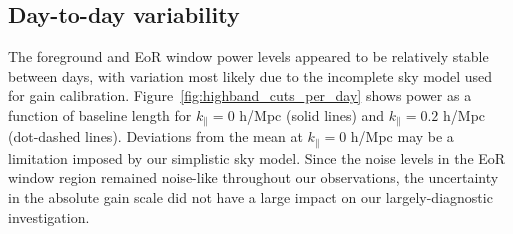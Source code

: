 \documentclass[twocolumn, trackchanges]{aastex61}
\begin{document}
{\subsection{Day-to-day variability}
\label{subsec:variability}

The foreground and EoR window power levels appeared to be relatively stable between days, with variation most likely due to the incomplete sky model used for gain calibration. Figure~\ref{fig:highband_cuts_per_day} shows power as a function of baseline length for $k_{\parallel}=0$ h/Mpc (solid lines) and $k_{\parallel}=0.2$ h/Mpc (dot-dashed lines). Deviations from the mean at $k_{\parallel}=0$ h/Mpc may be a limitation imposed by our simplistic sky model. Since the noise levels in the EoR window region remained noise-like throughout our observations, the uncertainty in the absolute gain scale did not have a large impact on our largely-diagnostic investigation.

}
\end{document}
